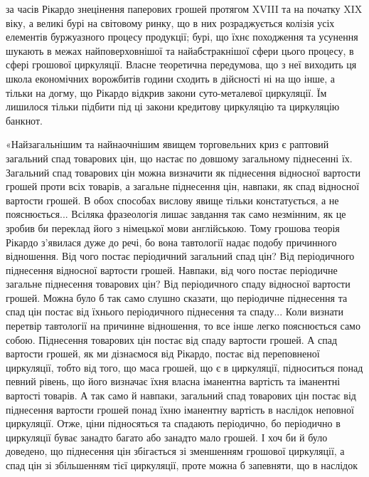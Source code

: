 \parcont{}  %
за часів Рікардо знецінення паперових грошей протягом XVIII та на початку
XIX віку, а великі бурі на світовому ринку, що в них розраджується колізія
усіх елементів буржуазного процесу продукції; бурі, що їхнє походження та усунення
шукають в межах найповерховнішої та найабстракнішої сфери цього процесу,
в сфері грошової циркуляції. Власне теоретична передумова, що з неї виходить
ця школа економічних ворожбитів години сходить в дійсності ні на що інше, а
тільки на догму, що Рікардо відкрив закони суто-металевої циркуляції. Їм лишилося
тільки підбити під ці закони кредитову циркуляцію та циркуляцію банкнот.

«Найзагальнішим та найнаочнішим явищем торговельних криз є раптовий
загальний спад товарових цін, що настає по довшому загальному піднесенні їх.
Загальний спад товарових цін можна визначити як піднесення відносної вартости
грошей проти всіх товарів, а загальне піднесення цін, навпаки, як спад
відносної вартости грошей. В обох способах вислову явище тільки констатується,
а не пояснюється... Всіляка фразеологія лишає завдання так само
незмінним, як це зробив би переклад його з німецької мови англійською. Тому
грошова теорія Рікардо з’явилася дуже до речі, бо вона тавтології надає подобу
причинного відношення. Від чого постає періодичний загальний спад цін? Від
періодичного піднесення відносної вартости грошей. Навпаки, від чого постає
періодичне загальне піднесення товарових цін? Від періодичного спаду відносної
вартости грошей. Можна було б так само слушно сказати, що періодичне піднесення
та спад цін постає від їхнього періодичного піднесення та спаду...
Коли визнати перетвір тавтології на причинне відношення, то все інше легко
пояснюється само собою. Піднесення товарових цін постає від спаду вартости
грошей. А спад вартости грошей, як ми дізнаємося від Рікардо, постає від переповненої
циркуляції, тобто від того, що маса грошей, що є в циркуляції, підноситься
понад певний рівень, що його визначає їхня власна іманентна вартість
та іманентні вартості товарів. А так само й навпаки, загальний спад товарових цін
постає від піднесення вартости грошей понад їхню іманентну вартість в наслідок
неповної циркуляції. Отже, ціни підносяться та спадають періодично, бо періодично
в циркуляції буває занадто багато або занадто мало грошей. І хоч би й було
доведено, що піднесення цін збігається зі зменшенням грошової циркуляції, а
спад цін зі збільшенням тієї циркуляції, проте можна б запевняти, що в наслідок
